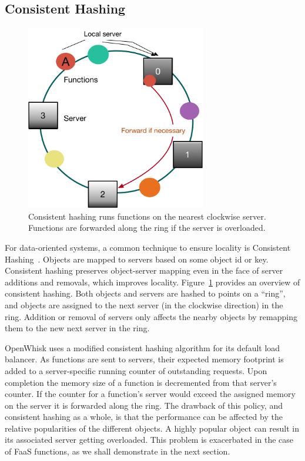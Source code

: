 \subsection{Consistent Hashing} 
\label{subsec:ch}

\begin{figure}
  \centering
  \includegraphics[width=0.7\textwidth]{chrlu/faaslb-osdi22/figs/ch-bl.pdf}
  \caption{Consistent hashing runs functions on the nearest clockwise server. Functions are forwarded along the ring if the server is overloaded.}
  \label{fig:ch}
\end{figure}

For data-oriented systems, a common technique to ensure locality is Consistent Hashing~\cite{karger1999web, karger1997consistent}.
Objects are mapped to servers based on some object id or key.
Consistent hashing preserves object-server mapping even in the face of server additions and removals, which improves locality.
%
Figure~\ref{fig:ch} provides an overview of consistent hashing. Both objects and servers are hashed to points on a ``ring'', and objects are assigned to the next server (in the clockwise direction) in the ring. 
Addition or removal of servers only affects the nearby objects by remapping them to the new next server in the ring.

OpenWhisk uses a modified consistent hashing algorithm for its default load balancer.
As functions are sent to servers, their expected memory footprint is added to a server-specific running counter of outstanding requests.
Upon completion the memory size of a function is decremented from that server's counter.
If the counter for a function's  server would exceed the assigned memory on the server it is forwarded along the ring.
%
The drawback of this policy, and consistent hashing as a whole, is that the performance can be affected by the relative popularities of the different objects.
A highly popular object can result in its associated server getting overloaded.
This problem is exacerbated in the case of FaaS functions, as we shall demonstrate in the next section. 
